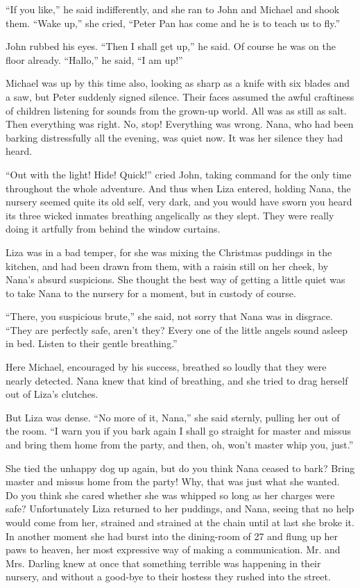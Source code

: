 ``If you like,'' he said indifferently, and she ran to John and Michael and
shook them.
``Wake up,'' she cried, ``Peter Pan has come and he is to teach us to fly.''

John rubbed his eyes.
``Then I shall get up,'' he said.
Of course he was on the floor already.
``Hallo,'' he said, ``I am up!''

Michael was up by this time also, looking as sharp as a knife with six blades
and a saw, but Peter suddenly signed silence.
Their faces assumed the awful craftiness of children listening for sounds from
the grown-up world.
All was as still as salt.
Then everything was right.
No, stop! Everything was wrong.
Nana, who had been barking distressfully all the evening, was quiet now.
It was her silence they had heard.

``Out with the light! Hide! Quick!'' cried John, taking command for the only
time throughout the whole adventure.
And thus when Liza entered, holding Nana, the nursery seemed quite its old self,
very dark, and you would have sworn you heard its three wicked inmates breathing
angelically as they slept.
They were really doing it artfully from behind the window curtains.

Liza was in a bad temper, for she was mixing the Christmas puddings in the
kitchen, and had been drawn from them, with a raisin still on her cheek, by
Nana's absurd suspicions.
She thought the best way of getting a little quiet was to take Nana to the
nursery for a moment, but in custody of course.

``There, you suspicious brute,'' she said, not sorry that Nana was in disgrace.
``They are perfectly safe, aren't they? Every one of the little angels sound
asleep in bed.
Listen to their gentle breathing.''

Here Michael, encouraged by his success, breathed so loudly that they were
nearly detected.
Nana knew that kind of breathing, and she tried to drag herself out of Liza's
clutches.

But Liza was dense.
``No more of it, Nana,'' she said sternly, pulling her out of the room.
``I warn you if you bark again I shall go straight for master and missus and
bring them home from the party, and then, oh, won't master whip you, just.''

She tied the unhappy dog up again, but do you think Nana ceased to bark?
Bring master and missus home from the party!
Why, that was just what she wanted.
Do you think she cared whether she was whipped so long as her charges were safe?
Unfortunately Liza returned to her puddings, and Nana, seeing that no help would
come from her, strained and strained at the chain until at last she broke it.
In another moment she had burst into the dining-room of 27 and flung up her paws
to heaven, her most expressive way of making a communication.
Mr. and Mrs. Darling knew at once that something terrible was happening in their
nursery, and without a good-bye to their hostess they rushed into the street.

